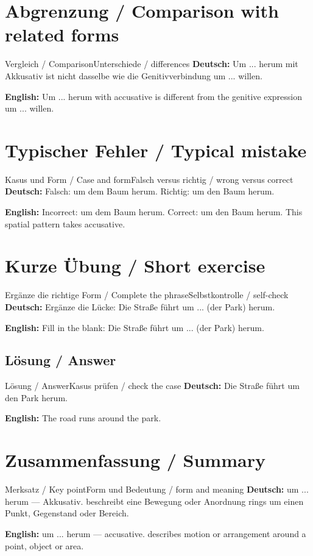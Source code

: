 \documentclass[a4paper,11pt]{article}
\newcommand{\GermanText}[1]{\textbf{Deutsch: }#1\par}
\newcommand{\EnglishText}[1]{{\small\color{SoftGray}\textbf{English: }#1\par}}
\begin{document}
\section{Abgrenzung / Comparison with related forms}
\begin{grammarentry}{Vergleich / Comparison}{Unterschiede / differences}
\GermanText{Um ... herum mit Akkusativ ist nicht dasselbe wie die Genitivverbindung um ... willen.}
\EnglishText{Um ... herum with accusative is different from the genitive expression um ... willen.}
\end{grammarentry}
\section{Typischer Fehler / Typical mistake}
\begin{grammarentry}{Kasus und Form / Case and form}{Falsch versus richtig / wrong versus correct}
\GermanText{Falsch: um dem Baum herum. Richtig: um den Baum herum.}
\EnglishText{Incorrect: um dem Baum herum. Correct: um den Baum herum. This spatial pattern takes accusative.}
\end{grammarentry}
\section{Kurze Übung / Short exercise}
\begin{grammarentry}{Ergänze die richtige Form / Complete the phrase}{Selbstkontrolle / self-check}
\GermanText{Ergänze die Lücke: Die Straße führt um ... (der Park) herum.}
\EnglishText{Fill in the blank: Die Straße führt um ... (der Park) herum.}
\end{grammarentry}
\subsection{Lösung / Answer}
\begin{grammarentry}{Lösung / Answer}{Kasus prüfen / check the case}
\GermanText{Die Straße führt um den Park herum.}
\EnglishText{The road runs around the park.}
\end{grammarentry}
\section{Zusammenfassung / Summary}
\begin{grammarentry}{Merksatz / Key point}{Form und Bedeutung / form and meaning}
\GermanText{um ... herum — Akkusativ. beschreibt eine Bewegung oder Anordnung rings um einen Punkt, Gegenstand oder Bereich.}
\EnglishText{um ... herum — accusative. describes motion or arrangement around a point, object or area.}
\end{grammarentry}
\end{document}
